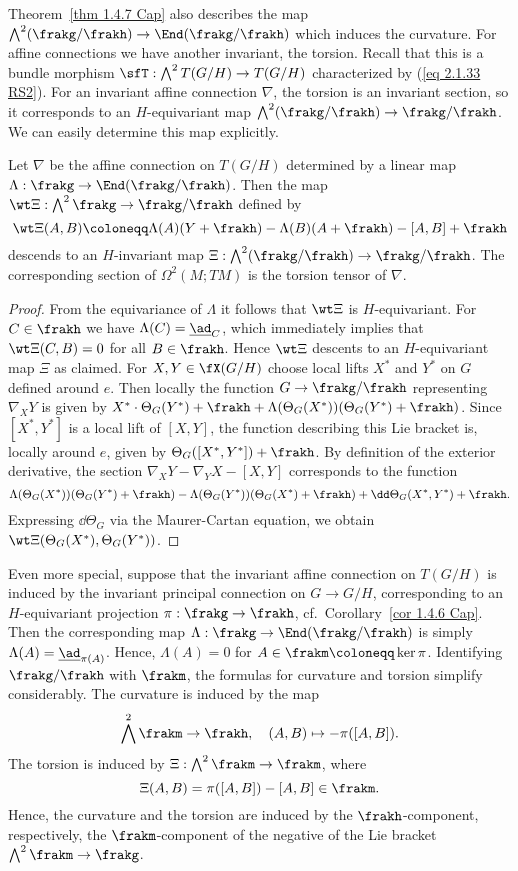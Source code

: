 Theorem~\ref{thm 1.4.7 Cap} also describes the map $\bigwedge^2(\frakg\slash\frakh)\to \End(\frakg\slash\frakh)$ which induces the curvature. For affine connections we have another invariant, the torsion. Recall that this is a bundle morphism $\sfT:\bigwedge^2 T(G\slash H)\to T(G\slash H)$ characterized by (\ref{eq 2.1.33 RS2}). For an invariant affine connection $\nabla$, the torsion is an invariant section, so it corresponds to an $H$-equivariant map $\bigwedge^2(\frakg\slash\frakh)\to \frakg\slash\frakh$. We can easily determine this map explicitly.

\begin{prop}
    Let $\nabla$ be the affine connection on $T(G\slash H)$ determined by a linear map $\Lambda:\frakg\to\End(\frakg\slash\frakh)$. Then the map $\wt\Xi:\bigwedge^2\frakg\to \frakg\slash\frakh$ defined by 
    \[\wt\Xi(A,B)\coloneqq \Lambda(A)(Y+\frakh)-\Lambda(B)(A+\frakh)-[A,B]+\frakh\]
    descends to an $H$-invariant map $\Xi:\bigwedge^2(\frakg\slash\frakh)\to \frakg\slash\frakh$. The corresponding section of $\Omega^2(M;TM)$ is the torsion tensor of $\nabla$.
\end{prop}
\begin{proof}
    From the equivariance of $\Lambda$ it follows that $\wt\Xi$ is $H$-equivariant. For $C\in\frakh$ we have $\Lambda(C)=\underline{\ad}_C$, which immediately implies that $\wt\Xi(C,B)=0$ for all $B\in\frakh$. Hence $\wt\Xi$ descents to an $H$-equivariant map $\Xi$ as claimed. For $X,Y\in\fX(G\slash H)$ choose local lifts $X^\ast$ and $Y^\ast$ on $G$ defined around $e$. Then locally the function $G\to \frakg\slash\frakh$ representing $\nabla_X Y$ is given by $X^\ast\cdot\Theta_G(Y^\ast)+\frakh+\Lambda(\Theta_G(X^\ast))(\Theta_G(Y^\ast)+\frakh)$. Since $[X^\ast,Y^\ast]$ is a local lift of $[X,Y]$, the function describing this Lie bracket is, locally around $e$, given by $\Theta_G([X^\ast,Y^\ast])+\frakh$. By definition of the exterior derivative, the section $\nabla_X Y-\nabla_Y X-[X,Y]$ corresponds to the function 
    \[\Lambda(\Theta_G(X^\ast))(\Theta_G(Y^\ast)+\frakh)-\Lambda(\Theta_G(Y^\ast))(\Theta_G(X^\ast)+\frakh)+\dd\Theta_G(X^\ast,Y^\ast)+\frakh.\]
    Expressing $\dd\Theta_G$ via the Maurer-Cartan equation, we obtain $\wt\Xi(\Theta_G(X^\ast),\Theta_G(Y^\ast))$.
\end{proof}

Even more special, suppose that the invariant affine connection on $T(G\slash H)$ is induced by the invariant principal connection on $G\to G\slash H$, corresponding to an $H$-equivariant projection $\pi:\frakg\to\frakh$, cf.\ Corollary~\ref{cor 1.4.6 Cap}. Then the corresponding map $\Lambda:\frakg\to \End(\frakg\slash\frakh)$ is simply $\Lambda(A)=\underline{\ad}_{\pi(A)}$. Hence, $\Lambda(A)=0$ for $A\in \frakm\coloneqq \ker\pi$. Identifying $\frakg\slash\frakh$ with $\frakm$, the formulas for curvature and torsion simplify considerably. The curvature is induced by the map 
\[\bigwedge^2\frakm\to \frakh,\quad (A,B)\mapsto -\pi([A,B]).\]
The torsion is induced by $\Xi:\bigwedge^2\frakm\to \frakm$, where 
\[\Xi(A,B)=\pi([A,B])-[A,B]\in\frakm.\]
Hence, the curvature and the torsion are induced by the $\frakh$-component, respectively, the $\frakm$-component of the negative of the Lie bracket $\bigwedge^2\frakm\to \frakg$.


